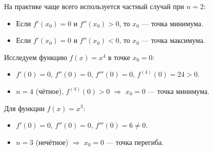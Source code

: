 \begin{consequence}
    На практике чаще всего используется частный случай при \(n = 2\):
    \begin{itemize}
        \item Если \(f'(x_0) = 0\) и \(f''(x_0) > 0\), то \(x_0\) — точка минимума.
        \item Если \(f'(x_0) = 0\) и \(f''(x_0) < 0\), то \(x_0\) — точка максимума.
    \end{itemize}
\end{consequence}

\begin{example}
    Исследуем функцию \(f(x) = x^4\) в точке \(x_0 = 0\):
    \begin{itemize}
        \item \(f'(0) = 0\), \(f''(0) = 0\), \(f'''(0) = 0\), \(f^{(4)}(0) = 24 > 0\).
        \item \(n = 4\) (чётное), \(f^{(4)}(0) > 0\) \(\Rightarrow\) \(x_0 = 0\) — точка минимума.
    \end{itemize}
    
    Для функции \(f(x) = x^3\):
    \begin{itemize}
        \item \(f'(0) = 0\), \(f''(0) = 0\), \(f'''(0) = 6 \neq 0\).
        \item \(n = 3\) (нечётное) \(\Rightarrow\) \(x_0 = 0\) — точка перегиба.
    \end{itemize}
\end{example}

